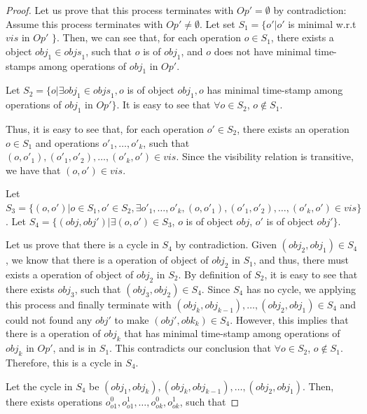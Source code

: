 {\begin {proof}
Let us prove that this process terminates with $\mathit{Op}' = \emptyset$ by contradiction: Assume this process terminates with $\mathit{Op}' \neq \emptyset$. Let set $S_1 = \{ o' \vert o'$ is minimal w.r.t $\mathit{vis}$ in $\mathit{Op}'$ $\}$. Then, we can see that, for each operation $o \in S_1$, there exists a object $\mathit{obj}_1 \in \mathit{objs}_1$, such that $o$ is of $\mathit{obj}_1$, and $o$ does not have minimal time-stamps among operations of $\mathit{obj}_1$ in $\mathit{Op}'$.

Let $S_2 = \{ o \vert \exists \mathit{obj}_1 \in \mathit{objs}_1, o$ is of object $\mathit{obj}_1, o$ has minimal time-stamp among operations of $\mathit{obj}_1$ in $\mathit{Op}' \}$. It is easy to see that $\forall o \in S_2$, $o \notin S_1$.

Thus, it is easy to see that, for each operation $o' \in S_2$, there exists an operation $o \in S_1$ and operations $o'_1,\ldots,o'_k$, such that $(o,o'_1),(o'_1,o'_2),\ldots,(o'_k,o') \in \mathit{vis}$. Since the visibility relation is transitive, we have that $(o,o') \in \mathit{vis}$.

Let $S_3 = \{ (o,o') \vert o \in S_1, o' \in S_2, \exists o'_1,\ldots,o'_k, (o,o'_1),(o'_1,o'_2),\ldots,(o'_k,o') \in \mathit{vis} \}$. Let $S_4 = \{ (\mathit{obj},\mathit{obj}') \vert \exists (o,o') \in S_3$, $o$ is of object $\mathit{obj}$, $o'$ is of object $\mathit{obj}' \}$.

Let us prove that there is a cycle in $S_4$ by contradiction. Given $(\mathit{obj}_2,\mathit{obj}_1) \in S_4$, we know that there is a operation of object of $\mathit{obj}_2$ in $S_1$, and thus, there must exists a operation of object of $\mathit{obj}_2$ in $S_2$. By definition of $S_2$, it is easy to see that there exists $\mathit{obj}_3$, such that $(\mathit{obj}_3,\mathit{obj}_2) \in S_4$. Since $S_4$ has no cycle, we applying this process and finally terminate with $(\mathit{obj}_k,\mathit{obj}_{\mathit{k-1}}),\ldots,(\mathit{obj}_2,\mathit{obj}_1) \in S_4$ and could not found any $\mathit{obj}'$ to make $(\mathit{obj}',\mathit{obk}_k) \in S_4$. However, this implies that there is a operation of $\mathit{obj}_k$ that has minimal time-stamp among operations of $\mathit{obj}_k$ in $\mathit{Op}'$, and is in $S_1$. This contradicts our conclusion that $\forall o \in S_2$, $o \notin S_1$. Therefore, this is a cycle in $S_4$.

Let the cycle in $S_4$ be $(\mathit{obj}_1,\mathit{obj}_k),(\mathit{obj}_k,\mathit{obj}_{\mathit{k-1}}),\ldots,(\mathit{obj}_2,\mathit{obj}_1)$. Then, there exists operations $o^{0}_{\mathit{o1}}, o^{1}_{\mathit{o1}},\ldots, o^{0}_{\mathit{ok}}, o^{1}_{\mathit{ok}}$, such that


\end{proof}}

